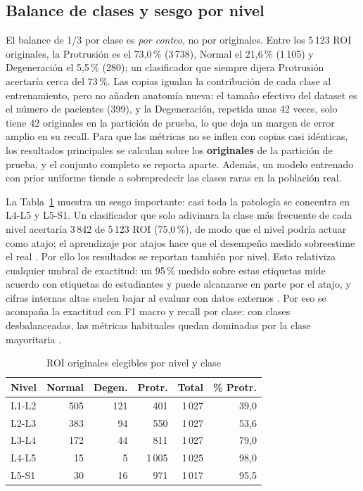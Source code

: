 \subsection{Balance de clases y sesgo por nivel}
\label{sec:balance}
El balance de 1/3 por clase es \emph{por conteo}, no por originales. Entre los 5\,123 ROI originales, la Protrusión es el 73,0\,\% (3\,738), Normal el 21,6\,\% (1\,105) y Degeneración el 5,5\,\% (280); un clasificador que siempre dijera Protrusión acertaría cerca del 73\,\%. Las copias igualan la contribución de cada clase al entrenamiento, pero no añaden anatomía nueva: el tamaño efectivo del dataset es el número de pacientes (399), y la Degeneración, repetida unas 42 veces, solo tiene 42 originales en la partición de prueba, lo que deja un margen de error amplio en su recall. Para que las métricas no se inflen con copias casi idénticas, los resultados principales se calculan sobre los \textbf{originales} de la partición de prueba, y el conjunto completo se reporta aparte. Además, un modelo entrenado con prior uniforme tiende a sobrepredecir las clases raras en la población real.

La Tabla~\ref{tab:nivel} muestra un sesgo importante: casi toda la patología se concentra en L4-L5 y L5-S1. Un clasificador que solo adivinara la clase más frecuente de cada nivel acertaría 3\,842 de 5\,123 ROI (75,0\,\%), de modo que el nivel podría actuar como atajo; el aprendizaje por atajos hace que el desempeño medido sobreestime el real \cite{onglt2024}. Por ello los resultados se reportan también por nivel. Esto relativiza cualquier umbral de exactitud: un 95\,\% medido sobre estas etiquetas mide acuerdo con etiquetas de estudiantes y puede alcanzarse en parte por el atajo, y cifras internas altas suelen bajar al evaluar con datos externos \cite{yi2023}. Por eso se acompaña la exactitud con F1 macro y recall por clase: con clases desbalanceadas, las métricas habituales quedan dominadas por la clase mayoritaria \cite{mosquera2024}.

\begin{table}[!htb]
\centering\footnotesize
\setlength{\tabcolsep}{4pt}
\caption{ROI originales elegibles por nivel y clase}
\label{tab:nivel}
\begin{tabular}{lrrrrr}
\toprule
Nivel & Normal & Degen. & Protr. & Total & \% Protr. \\
\midrule
L1-L2 & 505 & 121 & 401    & 1\,027 & 39,0 \\
L2-L3 & 383 & 94  & 550    & 1\,027 & 53,6 \\
L3-L4 & 172 & 44  & 811    & 1\,027 & 79,0 \\
L4-L5 & 15  & 5   & 1\,005 & 1\,025 & 98,0 \\
L5-S1 & 30  & 16  & 971    & 1\,017 & 95,5 \\
\bottomrule
\end{tabular}
\end{table}
